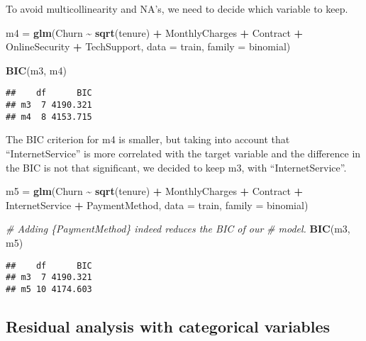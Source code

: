 \documentclass[
]{article}
\newenvironment{Shaded}{\begin{snugshade}}{\end{snugshade}}
\newcommand{\AttributeTok}[1]{\textcolor[rgb]{0.13,0.29,0.53}{#1}}
\newcommand{\CommentTok}[1]{\textcolor[rgb]{0.56,0.35,0.01}{\textit{#1}}}
\newcommand{\FunctionTok}[1]{\textcolor[rgb]{0.13,0.29,0.53}{\textbf{#1}}}
\newcommand{\NormalTok}[1]{#1}
\newcommand{\OtherTok}[1]{\textcolor[rgb]{0.56,0.35,0.01}{#1}}
\newcommand{\SpecialCharTok}[1]{\textcolor[rgb]{0.81,0.36,0.00}{\textbf{#1}}}
\begin{document}
To avoid multicollinearity and NA's, we need to decide which variable to
keep.

\begin{Shaded}
\begin{Highlighting}[]
\NormalTok{m4 }\OtherTok{=} \FunctionTok{glm}\NormalTok{(Churn }\SpecialCharTok{\textasciitilde{}} \FunctionTok{sqrt}\NormalTok{(tenure) }\SpecialCharTok{+}\NormalTok{ MonthlyCharges }\SpecialCharTok{+}\NormalTok{ Contract }\SpecialCharTok{+}\NormalTok{ OnlineSecurity }\SpecialCharTok{+}
\NormalTok{    TechSupport, }\AttributeTok{data =}\NormalTok{ train, }\AttributeTok{family =}\NormalTok{ binomial)}

\FunctionTok{BIC}\NormalTok{(m3, m4)}
\end{Highlighting}
\end{Shaded}

\begin{verbatim}
##    df      BIC
## m3  7 4190.321
## m4  8 4153.715
\end{verbatim}

The BIC criterion for m4 is smaller, but taking into account that
``InternetService'' is more correlated with the target variable and the
difference in the BIC is not that significant, we decided to keep m3,
with ``InternetService''.

\begin{Shaded}
\begin{Highlighting}[]
\NormalTok{m5 }\OtherTok{=} \FunctionTok{glm}\NormalTok{(Churn }\SpecialCharTok{\textasciitilde{}} \FunctionTok{sqrt}\NormalTok{(tenure) }\SpecialCharTok{+}\NormalTok{ MonthlyCharges }\SpecialCharTok{+}\NormalTok{ Contract }\SpecialCharTok{+}\NormalTok{ InternetService }\SpecialCharTok{+}
\NormalTok{    PaymentMethod, }\AttributeTok{data =}\NormalTok{ train, }\AttributeTok{family =}\NormalTok{ binomial)}

\CommentTok{\# Adding \{PaymentMethod\} indeed reduces the BIC of our}
\CommentTok{\# model.}
\FunctionTok{BIC}\NormalTok{(m3, m5)}
\end{Highlighting}
\end{Shaded}

\begin{verbatim}
##    df      BIC
## m3  7 4190.321
## m5 10 4174.603
\end{verbatim}

\hypertarget{residual-analysis-with-categorical-variables}{%
\subsection{Residual analysis with categorical
variables}\label{residual-analysis-with-categorical-variables}}
\end{document}

